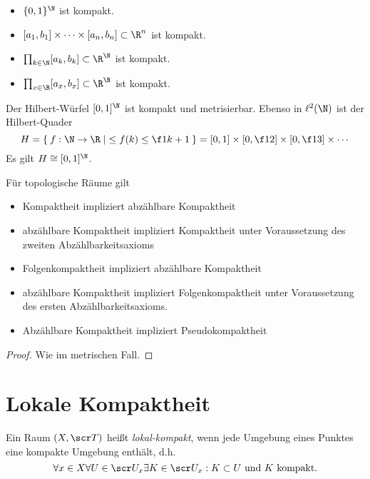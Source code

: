 \begin{ex}
	\begin{itemize}
		\item
			$\{0,1\}^\N$ ist kompakt.
		\item
			$[a_1,b_1] \times \dotsb \times [a_n,b_n] \subset \R^n$ ist kompakt.
		\item
			$\prod_{k\in\N} [a_k,b_k] \subset \R^\N$ ist kompakt.
		\item
			$\prod_{x\in\R} [a_x,b_x] \subset \R^\R$ ist kompakt.
	\end{itemize}
\end{ex}

\begin{ex}
	Der Hilbert-Würfel $[0,1]^\N$ ist kompakt und metrisierbar.
	Ebenso in $\ell^2(\N)$ ist der Hilbert-Quader
	\[
		H = \Set{ f: \N \to \R | \le f(k) \le \f 1{k+1} }
		= [0,1] \times [0,\f 12] \times [0, \f 13] \times \dotsb
	\]
	Es gilt $H \homeomorphic [0,1]^\N$.
\end{ex}

\begin{st}
	Für topologische Räume gilt
	\begin{itemize}
		\item
			Kompaktheit impliziert abzählbare Kompaktheit
		\item
			abzählbare Kompaktheit impliziert Kompaktheit unter Voraussetzung des zweiten Abzählbarkeitsaxioms
		\item
			Folgenkompaktheit impliziert abzählbare Kompaktheit
		\item
			abzählbare Kompaktheit impliziert Folgenkompaktheit unter Voraussetzung des ersten Abzählbarkeitsaxioms.
		\item
			Abzählbare Kompaktheit impliziert Pseudokompaktheit
	\end{itemize}
	\begin{proof}
		Wie im metrischen Fall.
	\end{proof}
\end{st}


\section{Lokale Kompaktheit}


\begin{df}
	Ein Raum $(X, \scr T)$ heißt \emph{lokal-kompakt}, wenn jede Umgebung eines Punktes eine kompakte Umgebung enthält, d.h.
	\[
		\forall x \in X \forall U \in \scr U_x \exists K \in \scr U_x : \text{$K \subset U$ und $K$ kompakt}.
	\]
\end{df}

